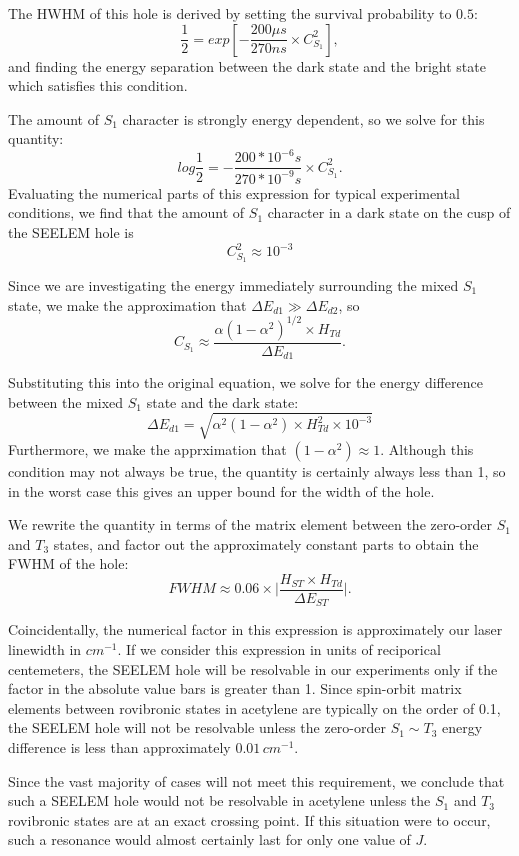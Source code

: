 \documentclass{article}
\begin{document}
The HWHM of this hole is derived by setting the survival probability
to $0.5$:
\begin{equation}
\frac{1}{2} = exp \left[ -\frac{200 \mu s}{270 ns} \times C_{S_1}^2 \right],
\end{equation}
and finding the energy separation between the dark state and the
bright state which satisfies this condition. 

The amount of $S_1$ character is strongly energy dependent, so we
solve for this quantity:
\begin{equation}
log \frac{1}{2} = - \frac{200 * 10^{-6} s}{270 * 10^{-9} s} \times
C_{S_1}^2.
\end{equation}
Evaluating the numerical parts of this expression for typical
experimental conditions, we find that the amount of $S_1$ character in
a dark state on the cusp of the SEELEM hole is
\begin{equation}
C_{S_1}^2 \approx 10^{-3}
\end{equation}

Since we are investigating the energy immediately surrounding the mixed $S_1$
state, we make the approximation that $\Delta E_{d1} \gg \Delta
E_{d2}$, so
\begin{equation}
C_{S_1} \approx \frac{ \alpha (1 - \alpha^2)^{1/2} \times H_{Td}}{\Delta E_{d1}}.
\end{equation}

Substituting this into the original equation, we solve for the energy
difference between the mixed $S_1$ state and the dark state:
\begin{equation}
\Delta E_{d1} = \sqrt{\alpha^2 (1 - \alpha^2) \times H_{Td}^2 \times 10^{-3}}
\end{equation}
Furthermore, we make the apprximation that $(1 - \alpha^2) \approx 1$.
Although this condition may not always be true, the quantity is
certainly always less than 1, so in the worst case this gives an upper
bound for the width of the hole.

We rewrite the quantity in terms of the matrix element between the
zero-order $S_1$ and $T_3$ states, and factor out the approximately
constant parts to obtain the FWHM of the hole:
\begin{equation}
FWHM \approx 0.06 \times \biggl\lvert \frac{ H_{ST} \times H_{Td} }{ \Delta
  E_{ST} } \biggr\rvert .
\end{equation}

Coincidentally, the numerical factor in this expression is
approximately our laser linewidth in $cm^{-1}$. If we consider this
expression in units of reciporical centemeters, the SEELEM hole
will be resolvable in our experiments only if the factor in the
absolute value bars is greater than 1. Since spin-orbit matrix
elements between rovibronic states in acetylene are typically on the
order of 0.1, the SEELEM hole will not be resolvable unless the
zero-order $S_1 \sim T_3$ energy difference is less than approximately
$0.01 \, cm^{-1}$.

Since the vast majority of cases will not meet this requirement, we
conclude that such a SEELEM hole would not be resolvable in acetylene
unless the $S_1$ and $T_3$ rovibronic states are at an exact crossing
point. If this situation were to occur, such a resonance would almost
certainly last for only one value of $J$.
\end{document}
